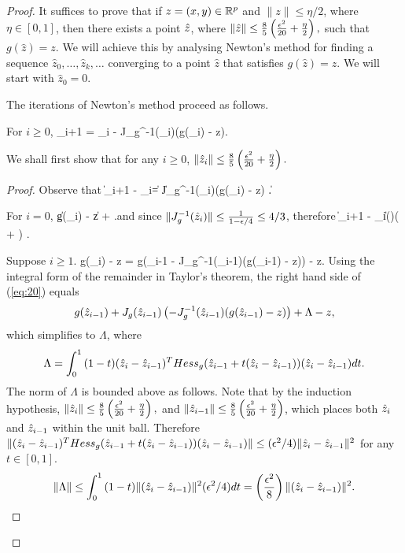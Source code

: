 \documentclass[final, 12pt]{colt2018} %
\begin{document}
\begin{proof}
It suffices to prove that if $z = (x, y) \in \mathbb R^p$ and $\|z\| \leq \eta/2$, where $\eta \in [0, 1]$,
then there exists a point $\hat{z}$, where $\|\hat{z}\| \leq \frac{8}{5}\left( \frac{{\epsilon}^2}{20} + \frac{\eta}{2}\right), $ such that $g(\hat z) = z.$
We will achieve this by analysing  Newton's method for finding a sequence $\hat z_0, \dots, \hat z_k, \dots $ converging to a point $\hat z $ that satisfies  $g(\hat z) = z$. We will start with $\hat z_0 = 0.$ 

The iterations of Newton's method proceed as follows.

For $i \geq 0$, 
\beq \hz_{i+1} = \hz_i - J_g^{-1}(\hz_i)(g(\hz_i) - z). \eeq
\begin{claim}

We shall first show that for any $i \geq 0$, $\|\hat{z}_i\| \leq \frac{8}{5}\left( \frac{{\epsilon}^2}{20} + \frac{\eta}{2}\right).$ 
\end{claim}
\begin{proof}
Observe that \beq\|\hz_{i+1} - \hz_i\| = \|J_g^{-1}(\hz_i)(g(\hz_i) - z) \|.\eeq

For $i=0$, \beq \|g(\hz_i) - z\| \leq {} + .\eeq and since $\|J_g^{-1}(\hat{z}_i)\| \leq \frac{1}{1-\epsilon/4} \leq 4/3$, therefore 
\beq{} \|\hz_{i+1} - \hz_i\| \leq \left(\right)\left(  + \right) .\eeq

Suppose $i \geq 1$. 
\beq {} g(\hz_i) - z =   g\left(\hz_{i-1} - J_g^{-1}(\hz_{i-1})(g(\hz_{i-1}) - z)\right) - z. \eeq
Using the integral form of the remainder in Taylor's theorem, the right hand side of (\ref{eq:20}) equals
$$g(\hat{z}_{i-1}) + J_g(\hat{z}_{i-1})\left( - J_g^{-1}(\hat{z}_{i-1})(g(\hat{z}_{i-1}) - z) \right) + \Lambda  - z,$$ which simplifies to $\Lambda$,
where $$\Lambda = \int_0^1 {(1-t)} (\hat{z}_{i} - \hat{z}_{i-1})^T Hess_g(\hat{z}_{i-1} + t(\hat{z}_{i} - \hat{z}_{i-1}))(\hat{z}_{i} - \hat{z}_{i-1})dt.$$
The norm of $\Lambda$ is bounded above as follows. Note that by the induction hypothesis, $\|\hat{z}_i\| \leq \frac{8}{5}\left( \frac{{\epsilon}^2}{20} + \frac{\eta}{2}\right),$ and $\|\hat{z}_{i-1}\| \leq \frac{8}{5}\left( \frac{{\epsilon}^2}{20} + \frac{\eta}{2}\right)$, which places both $\hat{z}_i$ and $\hat{z}_{i-1}$ within the unit ball. Therefore $\|(\hat z_{i} - \hat z_{i-1})^T Hess_g(\hat z_{i-1} + t(\hat z_{i} - \hat z_{i-1}))(\hat z_{i} - \hat z_{i-1})\| \leq ({\epsilon}^2/4)\|\hat z_i - \hat z_{i-1}\|^2$ for any $t \in [0, 1]$.
$$\|\Lambda\| \leq  \int_0^1 {(1-t)} \|(\hat{z}_{i} - \hat{z}_{i-1})\|^2 ({\epsilon}^2/4) dt =   \left(\frac{{\epsilon}^2}{8}\right) \|(\hat{z}_{i} - \hat{z}_{i-1})\|^2.$$


\end{proof}
\end{proof}
\end{document}
